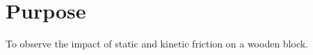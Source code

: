 
\section{Purpose}
\vspace{-0.5cm}
\singlespacing
To observe the impact of static and kinetic friction on a wooden block.
